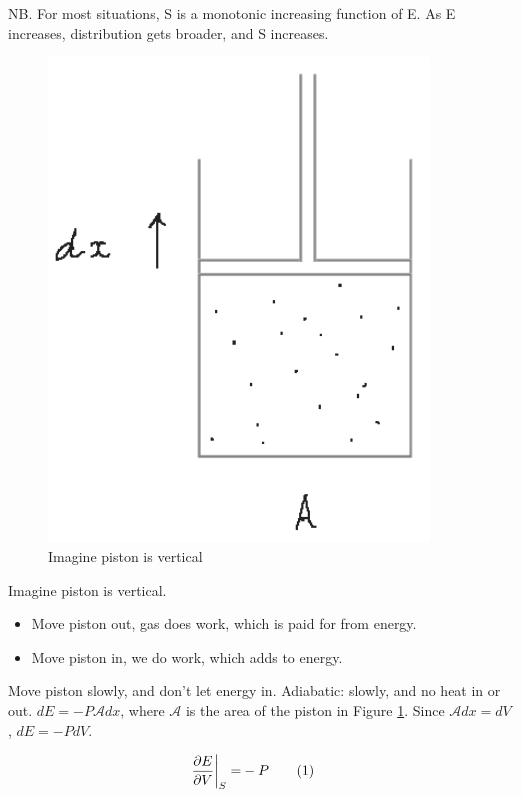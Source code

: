 \documentclass[]{article}
\newcommand\numberthis{\addtocounter{equation}{1}\tag{\theequation}}
\begin{document}
NB. For most situations, S is a monotonic increasing function of E. As E increases, distribution gets broader, and S increases. 

\begin{figure}[H]
	\caption{Imagine piston is vertical}\label{fig:vertical:piston}
	\includegraphics[width=0.9\textwidth]{vertical-piston}
\end{figure}

Imagine piston is vertical.

\begin{itemize}
	\item Move piston out, gas does work, which is paid for from energy.
	\item Move piston in, we do work, which adds to energy.
\end{itemize}

Move piston slowly, and don't let energy in. Adiabatic: slowly, and no heat in or out. $dE = - P \mathcal{A}dx$, where $\mathcal{A}$ is the area of the piston in Figure \ref{fig:vertical:piston}. Since $\mathcal{A}dx = dV$, $dE = -P dV$. 

\begin{align*}
\frac{\partial E}{\partial V}\bigg|_S =& - P\numberthis \label{eq:defP}
\end{align*}
\end{document}

